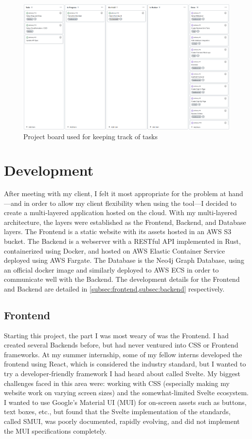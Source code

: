 \documentclass{paper}
\begin{document}
\begin{figure}
  \includegraphics[width=\linewidth]{Github-Project-Board}
  \caption{Project board used for keeping track of tasks}
  \label{design:project_board}
\end{figure}

\section{Development}
\label{sec:develop}
After meeting with my client, I felt it most appropriate for the problem at hand---and in order to allow my client flexibility when using the tool---I decided to create a multi-layered application hosted on the cloud.
With my multi-layered architecture, the layers were established as the Frontend, Backend, and Database layers.
The Frontend is a static website with its assets hosted in an AWS S3 bucket.
The Backend is a webserver with a RESTful API implemented in Rust, containerized using Docker, and hosted on AWS Elastic Container Service deployed using AWS Fargate.
The Database is the Neo4j Graph Database, using an official docker image and similarly deployed to AWS ECS in order to communicate well with the Backend.
The development details for the Frontend and Backend are detailed in \cref{subsec:frontend,subsec:backend} respectively.

\subsection{Frontend}
\label{subsec:frontend}
Starting this project, the part I was most weary of was the Frontend.
I had created several Backends before, but had never ventured into CSS or Frontend frameworks.
At my summer internship, some of my fellow interns developed the frontend using React, which is considered the industry standard, but I wanted to try a developer-friendly framework I had heard about called Svelte.
My biggest challenges faced in this area were: working with CSS (especially making my website work on varying screen sizes) and the somewhat-limited Svelte ecosystem.
I wanted to use Google's Material UI (MUI) for on-screen assets such as buttons, text boxes, etc., but found that the Svelte implementation of the standards, called SMUI, was poorly documented, rapidly evolving, and did not implement the MUI specifications completely.
\end{document}
